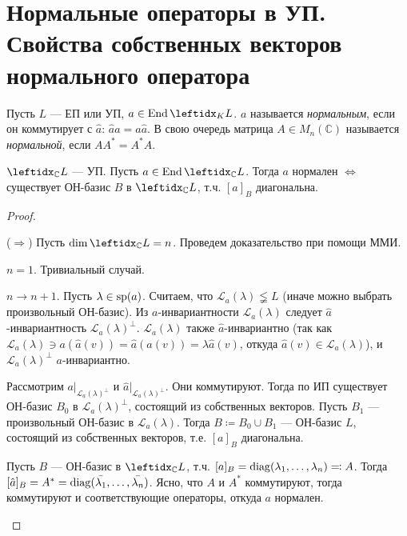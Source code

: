 \section{Нормальные операторы в УП. Свойства собственных векторов нормального оператора}

\begin{defn}
    Пусть $L$ --- ЕП или УП, $a \in \End \lsub{K}{L}$. $a$ называется \textit{нормальным}, если он коммутирует с $\hat{a}$: $\hat{a} a = a \hat{a}$. В свою очередь матрица $A \in M_n(\mathbb{C})$ называется \textit{нормальной}, если $AA^* = A^*A$.
\end{defn}

\begin{thm*}
    $\lsub{\mathbb{C}}{L}$ --- УП. Пусть $a \in \End \lsub{\mathbb{C}}{L}$. Тогда $a$ нормален $\Leftrightarrow$ существует ОН-базис $B$ в $\lsub{\mathbb{C}}{L}$, т.ч. $[a]_B$ диагональна.
\end{thm*}

\begin{proof}
    \begin{proofpart}{($\Rightarrow$)}
        Пусть $\dim \lsub{\mathbb{C}}{L} = n$. Проведем доказательство при помощи ММИ.
        
        \underline{$n = 1$}. Тривиальный случай.
        
        \underline{$n \to n + 1$}. Пусть $\lambda \in \operatorname{sp}(a)$. Считаем, что $\mathcal{L}_a(\lambda) \lneqq L$ (иначе можно выбрать произвольный ОН-базис). Из $a$-инвариантности $\mathcal{L}_a(\lambda)$ следует $\hat{a}$-инвариантность $\mathcal{L}_a(\lambda)^\perp$. $\mathcal{L}_a(\lambda)$ также $\hat{a}$-инвариантно (так как $\mathcal{L}_a(\lambda) \ni a(\hat{a}(v)) = \hat{a}(a(v)) = \lambda \hat{a}(v)$, откуда $\hat{a}(v) \in \mathcal{L}_a(\lambda)$), и $\mathcal{L}_a(\lambda)^\perp$ $a$-инвариантно.
        
        Рассмотрим $a\vert_{\mathcal{L}_a(\lambda)^\perp}$ и $\hat{a}\vert_{\mathcal{L}_a(\lambda)^\perp}$. Они коммутируют. Тогда по ИП существует ОН-базис $B_0$ в $\mathcal{L}_a(\lambda)^\perp$, состоящий из собственных векторов. Пусть $B_1$ --- произвольный ОН-базис в $\mathcal{L}_a(\lambda)$. Тогда $B \coloneqq B_0 \cup B_1$ --- ОН-базис $L$, состоящий из собственных векторов, т.е. $[a]_B$ диагональна.
    \end{proofpart}

    \begin{proofpart}
        Пусть $B$ --- ОН-базис в $\lsub{\mathbb{C}}{L}$, т.ч. $[a]_B = \operatorname{diag}(\lambda_1, \dots, \lambda_n) \eqqcolon A$. Тогда $[\hat{a}]_B = A^* = \operatorname{diag}(\bar{\lambda_1}, \dots, \bar{\lambda_n})$. Ясно, что $A$ и $A^*$ коммутируют, тогда коммутируют и соответствующие операторы, откуда $a$ нормален.
    \end{proofpart}
\end{proof}

